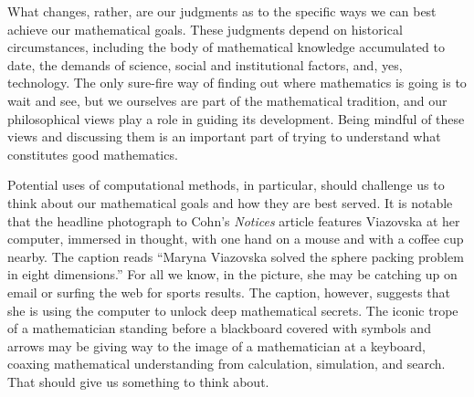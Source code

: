 \documentclass{amsart}
\theoremstyle{definition}
\theoremstyle{remark}
\numberwithin{equation}{section}
\begin{document}
What changes, rather, are our judgments as to the specific ways we can best achieve our mathematical goals. These judgments depend on historical circumstances, including the body of mathematical knowledge accumulated to date, the demands of science, social and institutional factors, and, yes, technology. The only sure-fire way of finding out where mathematics is going is to wait and see, but we ourselves are part of the mathematical tradition, and our philosophical views play a role in guiding its development. Being mindful of these views and discussing them is an important part of trying to understand what constitutes good mathematics.

Potential uses of computational methods, in particular, should challenge us to think about our mathematical goals and how they are best served. It is notable that the headline photograph to Cohn's \emph{Notices} article features Viazovska at her computer, immersed in thought, with one hand on a mouse and with a coffee cup nearby. The caption reads ``Maryna Viazovska solved the sphere packing problem in eight dimensions.'' For all we know, in the picture, she may be catching up on email or surfing the web for sports results. The caption, however, suggests that she is using the computer to unlock deep mathematical secrets. The iconic trope of a mathematician standing before a blackboard covered with symbols and arrows may be giving way to the image of a mathematician at a keyboard, coaxing mathematical understanding from calculation, simulation, and search. That should give us something to think about.



\end{document}
